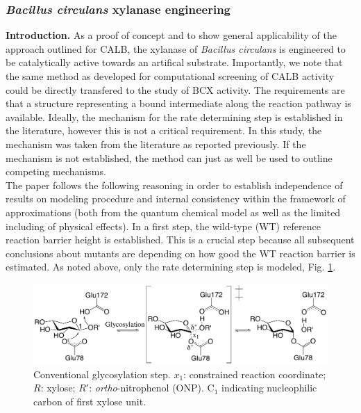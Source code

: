 \subsubsection{\textit{Bacillus circulans} xylanase engineering}
\textbf{Introduction.}
As a proof of concept and to show general applicability of the approach outlined for CALB, the xylanase of \textit{Bacillus circulans} is engineered to be catalytically active towards an artifical substrate.
Importantly, we note that the same method as developed for computational screening of CALB activity could be directly transfered to the study of BCX activity.
The requirements are that a structure representing a bound intermediate along the reaction pathway is available.
Ideally, the mechanism for the rate determining step is established in the literature, however this is not a critical requirement.
In this study, the mechanism was taken from the literature as reported previously\cite{joshi2000hydrogen,joshi2001dissecting}.
If the mechanism is not established, the method can just as well be used to outline competing mechanisms.\\
The paper follows the following reasoning in order to establish independence of results on modeling procedure and internal consistency within the framework of approximations (both from the quantum chemical model as well as the limited including of physical effects).
In a first step, the wild-type (WT) reference reaction barrier height is established.
This is a crucial step because all subsequent conclusions about mutants are depending on how good the WT reaction barrier is estimated.
As noted above, only the rate determining step is modeled, Fig. \ref{fig:bcx_mechanism}.
\begin{figure}[htbp] 
\centering
\includegraphics[width=1.0\linewidth]{mechanism.pdf}
\caption{
Conventional glycosylation step. $x_1$: constrained reaction coordinate; $R$: xylose; 
$R'$: \textit{ortho}-nitrophenol (ONP).
C$_1$ indicating nucleophilic carbon of first xylose unit.
}
\label{fig:bcx_mechanism}
\end{figure}
